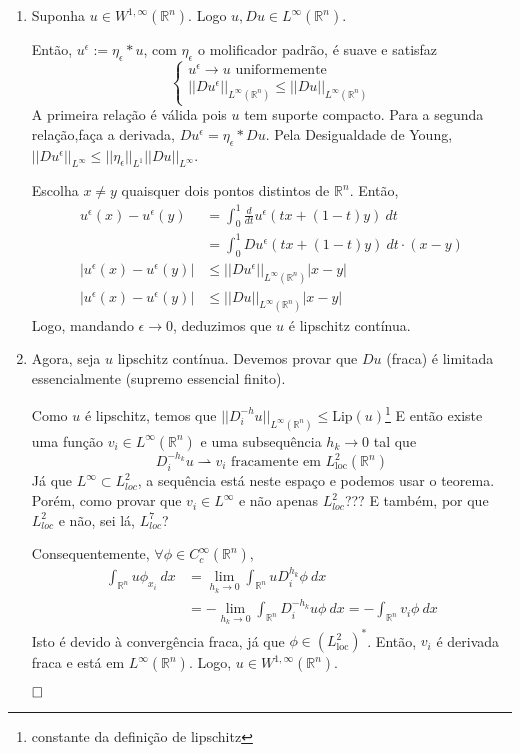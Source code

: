 \documentclass[a4paper, 11pt]{book}
\newcommand{\qed}{$\hfill\square$}
\newcommand{\rn}{{\mathbb{R}^n}}
\newcommand{\e}{\epsilon}
\begin{document}
\begin{enumerate}
	\item Suponha $u \in W^{1,\infty}(\rn)$. Logo $u, Du \in L^\infty(\rn)$.

	Então, $u^\epsilon := \eta_\epsilon * u$, com $\eta_\e$ o molificador padrão, é suave e satisfaz \[\begin{cases}
		u^\e \rightarrow u \text{ uniformemente} \\
		||Du^\e||_{L^\infty(\rn)} \leq ||Du||_{L^\infty(\rn)}
	\end{cases}\]
	A primeira relação é válida pois $u$ tem suporte compacto. Para a segunda relação,faça a derivada, $Du^\e = \eta_\epsilon * Du$. Pela Desigualdade de Young, $||Du^\e||_{L^\infty} \leq ||\eta_\e||_{L^1} ||Du||_{L^\infty}$.
	
	Escolha $x\neq y$ quaisquer dois pontos distintos de $\rn$. Então, \begin{align*}
		u^\e(x) - u^\e(y) &= \int_0^1 \frac{d}{dt}u^\e(tx + (1-t)y)\ dt \\
		&= \int_0^1 Du^\e(tx + (1-t)y)\ dt \cdot (x-y) \\
		|u^\e(x) - u^\e(y)| &\leq ||Du^\e||_{L^\infty(\rn)}|x-y| \\ 
		|u^\e(x) - u^\e(y)| &\leq ||Du||_{L^\infty(\rn)}|x-y|
	\end{align*}
	Logo, mandando $\e \rightarrow 0$, deduzimos que $u$ é lipschitz contínua.
	
	\item Agora, seja $u$ lipschitz contínua. Devemos provar que $Du$ (fraca) é limitada essencialmente (supremo essencial finito).

	Como $u$ é lipschitz, temos que $||D_i^{-h}u||_{L^\infty(\rn)}\leq \text{Lip}(u)$\footnote{constante da definição de lipschitz} E então existe uma função $v_i \in L^\infty(\rn)$ e uma subsequência $h_k\rightarrow 0$ tal que
	\[ D_i^{-h_k}u \rightharpoonup v_i \text{ fracamente em } L^2_{\text{loc}}(\rn)\]
	Já que $L^{\infty}\subset L^2_{loc}$, a sequência está neste espaço e podemos usar o teorema. Porém, como provar que $v_i \in L^\infty$ e não apenas $L^2_{loc}$??? E também, por que $L^2_{loc}$ e não, sei lá, $L^7_{loc}$?

	Consequentemente, $\forall \phi \in C^\infty_c(\rn)$,\begin{align*}
		\int_\rn u \phi_{x_i}\ dx &= \lim_{h_k\rightarrow 0}\int_\rn u D_i^{h_k}\phi \ dx \\
		&= - \lim_{h_k\rightarrow 0} \int_\rn D_i^{-h_k}u\phi \ dx = - \int_\rn v_i \phi \ dx
	\end{align*}
	Isto é devido à convergência fraca, já que $\phi \in (L^2_{\text{loc}})^*$. Então, $v_i$ é derivada fraca e está em $L^\infty(\rn)$. Logo, $u \in W^{1,\infty}(\rn)$.
	
	\qed
\end{enumerate}
\end{document}
